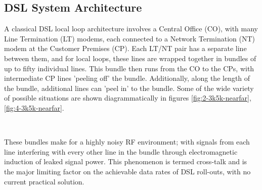 \subsection{DSL System Architecture}
A classical DSL local loop architecture involves a Central Office (CO), with many Line Termination (LT) modems,  each connected to a Network Termination (NT) modem at the Customer Premises (CP). Each LT/NT pair has a separate line between them, and for local loops, these lines are wrapped together in bundles of up to fifty individual lines. This bundle then runs from the CO to the CPs, with intermediate CP lines 'peeling off' the bundle. Additionally, along the length of the bundle, additional lines can 'peel in' to the bundle. Some of the wide variety of possible situations are shown diagrammatically in figures \ref{fig:2-3k5k-nearfar},\ref{fig:4-3k5k-nearfar}.

\begin{figure}[h!]
  \centering
  \\
\end{figure}

These bundles make for a highly noisy RF environment; with signals from each line interfering with every other line in the bundle through electromagnetic induction of leaked signal power. This phenomenon is termed cross-talk and is the major limiting factor on the achievable data rates of DSL roll-outs, with no current practical solution.

